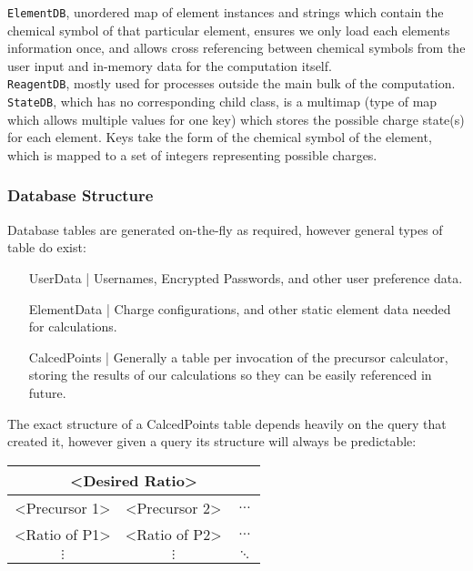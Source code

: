 \texttt{ElementDB}, unordered map of element instances and strings which contain the chemical symbol of that particular element, ensures we only load each elements information once, and allows cross referencing between chemical symbols from the user input and in-memory data for the computation itself. \\

\texttt{ReagentDB}, mostly used for processes outside the main bulk of the computation. \\

\texttt{StateDB}, which has no corresponding child class, is a multimap (type of map which allows multiple values for one key) which stores the possible charge state(s) for each element. Keys take the form of the chemical symbol of the element, which is mapped to a set of integers representing possible charges.


\subsubsection{Database Structure} 
Database tables are generated on-the-fly as required, however general types of table do exist:

\begin{enumerate}[label = {}, leftmargin=\widthof{CalcedPoints |}+\labelsep]
	\item[UserData |] Usernames, Encrypted Passwords, and other user preference data.
	
	\item[ElementData |] Charge configurations, and other static element data needed for calculations.
	
	\item[CalcedPoints |] Generally a table per invocation of the precursor calculator, storing the results of our calculations so they can be easily referenced in future. 
\end{enumerate}

The exact structure of a CalcedPoints table depends heavily on the query that created it, however given a query its structure will always be predictable: 

\begin{table}[h!]
	\centering
	\begin{tabular}{|c|c|c|}
		\hline
		\multicolumn{3}{|c|}{\textless{}Desired Ratio\textgreater{}} \\ \hline
		\textless{}Precursor 1\textgreater{} & \textless{}Precursor 2\textgreater{} & $\dots$ \\ \hline
		\textless{}Ratio of P1\textgreater{} & \textless{}Ratio of P2\textgreater{} & $\dots$ \\
		$\vdots$ & $\vdots$ & $\ddots$ \\
	\end{tabular}
\end{table}

